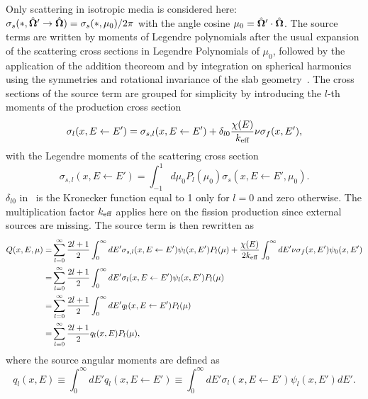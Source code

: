 Only scattering in isotropic media is considered here: $\sigma_s(\ast, \hat{\bm{\Omega}}' \rightarrow \hat{\bm{\Omega}}) = \sigma_s(\ast, \mu_0)/2\pi$ with the angle cosine $\mu_0 = \hat{\bm{\Omega}}' \cdot \hat{\bm{\Omega}}$. The source terms are written by moments of Legendre polynomials after the usual expansion of the scattering cross sections in Legendre Polynomials of $\mu_0$, followed by the application of the addition theoreom and by integration on spherical harmonics using the symmetries and rotational invariance of the slab geometry~\cite{Bell-1970}. The cross sections of the source term are grouped for simplicity by introducing the $l$-th moments of the production cross section~\cite{Tomatis-2011}
\begin{equation}\label{eq:src-mmnts}
\sigma_l(x,E\leftarrow E') = \sigma_{s,l}(x,E\leftarrow E')
+ \delta_{l0}\frac{\chi(E)}{{k_{\textrm{\scriptsize{eff}}}}}\nu\sigma_f(x,E'),
\end{equation}
with the Legendre moments of the scattering cross section
\begin{equation}\label{eq:src-mmnts-explicit}
\sigma_{s,l}(x,E\leftarrow E') = \int_{-1}^1 d\mu_0 P_l(\mu_0)\sigma_s(x,E\leftarrow E',\mu_0).
\end{equation}
$\delta_{l0}$ in~ is the Kronecker function equal to 1 only for $l=0$ and zero otherwise. The multiplication factor ${k_{\textrm{\scriptsize{eff}}}}$ applies here on the fission production since external sources are missing. The source term is then rewritten as
\begin{equation}\label{eq:src}
\begin{split}
Q(x,E,\mu)=& \sum\limits_{l=0}^\infty {
	\frac{2l+1}{2} \int_0^\infty { dE'
		\sigma_{s,l}(x,E\leftarrow E')\psi_l(x,E')\ensuremath{P_l(\mu)} 			
	}
} 
+ \frac{\chi(E)}{2{k_{\textrm{\scriptsize{eff}}}}} \int_0^\infty { dE'
	\nu\sigma_f(x,E') \psi_0(x,E')
} \\
=&\sum\limits_{l=0}^\infty {
	\frac{2l+1}{2} \int_0^\infty { dE'
		\sigma_l(x,E\leftarrow E')\psi_l(x,E')\ensuremath{P_l(\mu)} 			
	}
} \\
=&\sum\limits_{l=0}^\infty {
\frac{2l+1}{2} \int_0^\infty { dE'
	q_l(x,E\leftarrow E')\ensuremath{P_l(\mu)} 			
	}
} \\
=&\sum\limits_{l=0}^\infty {
	\frac{2l+1}{2} q_l(x,E)\ensuremath{P_l(\mu)} 			
},
\end{split}
\end{equation}
where the source angular moments are defined as
\begin{equation}\label{eq:q_l}
q_l(x,E) \equiv \int_0^\infty dE' q_l(x,E\leftarrow E') \equiv 
\int_0^\infty dE' \sigma_l(x,E\leftarrow E')\psi_l(x,E') dE' .
\end{equation}

